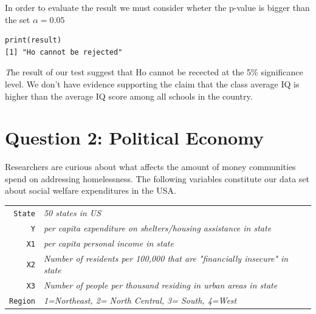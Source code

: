 \documentclass[12pt,letterpaper]{article}
\begin{document}
\vspace{.5cm}
 
\vspace{.5cm}
\noindent In order to evaluate the result we must consider wheter the p-value is bigger than the set $\alpha=0.05$ \\
\vspace{.5cm}
 
\vspace{.5cm}
\begin{verbatim}
print(result)
[1] "Ho cannot be rejected"
\end{verbatim}
\textit The result of our test suggest that Ho cannot be recected at the 5\% significance level. We don't have evidence supporting the claim that the class average IQ is higher than the average IQ score among all schools in the country. \\ 

\newpage

	\section*{Question 2: Political Economy}

\noindent Researchers are curious about what affects the amount of money communities spend on addressing homelessness. The following variables constitute our data set about social welfare expenditures in the USA. \\
\vspace{.5cm}


\begin{tabular}{r|l}
	\texttt{State} &\emph{50 states in US} \\
	\texttt{Y} & \emph{per capita expenditure on shelters/housing assistance in state}\\
	\texttt{X1} &\emph{per capita personal income in state} \\
	\texttt{X2} &  \emph{Number of residents per 100,000 that are "financially insecure" in state}\\
	\texttt{X3} &  \emph{Number of people per thousand residing in urban areas in state} \\
	\texttt{Region} &  \emph{1=Northeast, 2= North Central, 3= South, 4=West} \\
\end{tabular}
\end{document}

